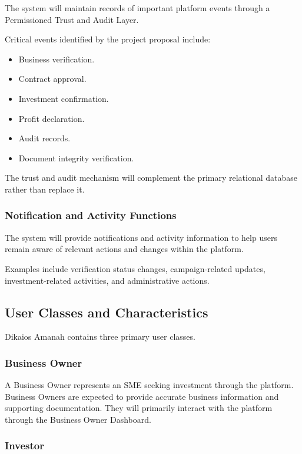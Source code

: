 The system will maintain records of important platform events through a
Permissioned Trust and Audit Layer.

Critical events identified by the project proposal include:

\begin{itemize}
    \item Business verification.
    \item Contract approval.
    \item Investment confirmation.
    \item Profit declaration.
    \item Audit records.
    \item Document integrity verification.
\end{itemize}

The trust and audit mechanism will complement the primary relational
database rather than replace it.


\subsubsection{Notification and Activity Functions}

The system will provide notifications and activity information to help
users remain aware of relevant actions and changes within the platform.

Examples include verification status changes, campaign-related updates,
investment-related activities, and administrative actions.


\subsection{User Classes and Characteristics}

Dikaios Amanah contains three primary user classes.

\subsubsection{Business Owner}

A Business Owner represents an SME seeking investment through the platform.
Business Owners are expected to provide accurate business information and
supporting documentation. They will primarily interact with the platform
through the Business Owner Dashboard.

\subsubsection{Investor}

